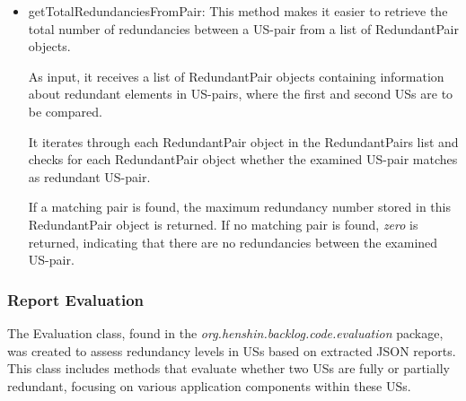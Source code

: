 \begin{itemize}
	\item getTotalRedundanciesFromPair: This method makes it easier to retrieve the total number of redundancies between a US-pair from a list of RedundantPair objects.
	
	As input, it receives a list of RedundantPair objects containing information about redundant elements in US-pairs, where the first and second USs are to be compared.
	
	It iterates through each RedundantPair object in the RedundantPairs list and checks for each RedundantPair object whether the examined US-pair matches as redundant US-pair. 
	
	If a matching pair is found, the maximum redundancy number stored in this RedundantPair object is returned. If no matching pair is found, \textit{zero} is returned, indicating that there are no redundancies between the examined US-pair.
\end{itemize}
\subsubsection*{Report Evaluation}\label{step_report_evaluation}
The Evaluation class, found in the \textit{org.henshin.backlog.code.evaluation} package, was created to assess redundancy levels in USs based on extracted JSON reports. This class includes methods that evaluate whether two USs are fully or partially redundant, focusing on various application components within these USs.

